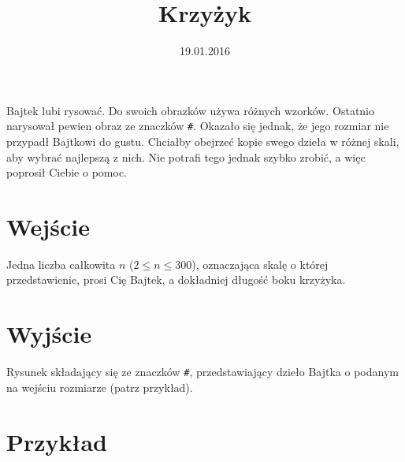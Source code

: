 \documentclass[zad,zawodnik,utf8]{sinol}
\title{Krzyżyk}
\author{} %
\date{19.01.2016}
\begin{document}
  \begin{tasktext}%
Bajtek lubi rysować. Do swoich obrazków używa różnych wzorków. Ostatnio narysował pewien obraz ze znaczków \texttt{\#}. Okazało się jednak, że jego rozmiar nie przypadł Bajtkowi do gustu. Chciałby obejrzeć kopie swego dzieła w różnej skali, aby wybrać najlepszą z nich. Nie potrafi tego jednak szybko zrobić, a więc poprosił Ciebie o pomoc.

  \section{Wejście}
Jedna liczba całkowita $n$ ($2 \leq n \leq 300$), oznaczająca skalę o której przedstawienie, prosi Cię Bajtek, a dokładniej długość boku krzyżyka.

  \section{Wyjście}
Rysunek składający się ze znaczków \texttt{\#}, przedstawiający dzieło Bajtka o podanym na wejściu rozmiarze (patrz przykład).

  \section{Przykład}
  \end{tasktext}
\end{document}
